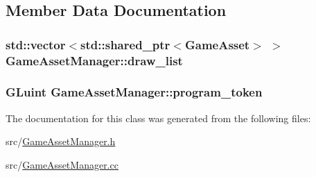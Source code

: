 \subsection{Member Data Documentation}
\hypertarget{classGameAssetManager_a671cddd92f1de4186c582fe0c4297b7d}{}
\subsubsection[{draw\+\_\+list}]{\setlength{\rightskip}{0pt plus 5cm}std\+::vector$<$std\+::shared\+\_\+ptr$<${\bf Game\+Asset}$>$ $>$ Game\+Asset\+Manager\+::draw\+\_\+list\hspace{0.3cm}{\ttfamily [private]}}\label{classGameAssetManager_a671cddd92f1de4186c582fe0c4297b7d}
\hypertarget{classGameAssetManager_ad7bab17862e06ca692289f934b40548b}{}
\subsubsection[{program\+\_\+token}]{\setlength{\rightskip}{0pt plus 5cm}G\+Luint Game\+Asset\+Manager\+::program\+\_\+token\hspace{0.3cm}{\ttfamily [private]}}\label{classGameAssetManager_ad7bab17862e06ca692289f934b40548b}


The documentation for this class was generated from the following files\+:\begin{DoxyCompactItemize}
\item 
src/\hyperlink{GameAssetManager_8h}{Game\+Asset\+Manager.\+h}\item 
src/\hyperlink{GameAssetManager_8cc}{Game\+Asset\+Manager.\+cc}\end{DoxyCompactItemize}

